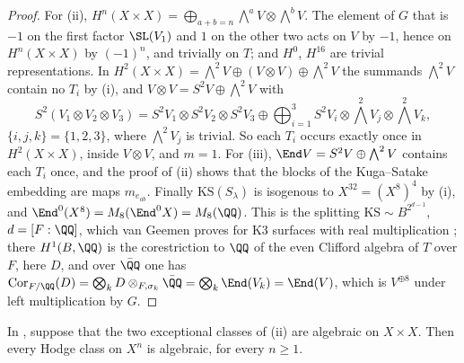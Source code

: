\begin{proof}
For (ii),
$H^{n}(X\times X)=\bigoplus_{a+b=n}\bigwedge^{a}V\otimes\bigwedge^{b}V$. The
element of $G$ that is $-1$ on the first factor $\SL(V_{1})$ and $1$ on the
other two acts on $V$ by $-1$, hence on $H^{n}(X\times X)$ by $(-1)^{n}$, and
trivially on $T$; and $H^{0}$, $H^{16}$ are trivial representations. In
$H^{2}(X\times X)=\bigwedge^{2}V\oplus(V\otimes V)\oplus\bigwedge^{2}V$ the
summands $\bigwedge^{2}V$ contain no $T_{i}$ by (i), and
$V\otimes V=S^{2}V\oplus\bigwedge^{2}V$ with
\[
  S^{2}(V_{1}\otimes V_{2}\otimes V_{3})
  =S^{2}V_{1}\otimes S^{2}V_{2}\otimes S^{2}V_{3}
  \oplus\bigoplus_{i=1}^{3}S^{2}V_{i}\otimes
  \textstyle\bigwedge^{2}V_{j}\otimes\bigwedge^{2}V_{k},
\]
$\{i,j,k\}=\{1,2,3\}$, where $\bigwedge^{2}V_{j}$ is trivial. So each $T_{i}$
occurs exactly once in $H^{2}(X\times X)$, inside $V\otimes V$, and $m=1$.
For (iii), $\End V=S^{2}V\oplus
\bigwedge^{2}V$ contains each $T_{i}$ once, and the proof of
(ii) shows that the blocks of the Kuga--Satake embedding
are maps $m_{e_{ab}}$. Finally $\mathrm{KS}(S_{\lambda})$ is isogenous to
$X^{32}=(X^{8})^{4}$ by (i), and
$\End^{0}(X^{8})=M_{8}(\End^{0}X)=M_{8}(\QQ)$. This is the splitting
$\mathrm{KS}\sim B^{2^{d-1}}$, $d=[F:\QQ]$, which van Geemen proves for K3
surfaces with real multiplication \cite{vG08}; there $H^{1}(B,\QQ)$ is the
corestriction to $\QQ$ of the even Clifford algebra of $T$ over $F$, here
$D$, and over $\bar{\QQ}$ one has $\operatorname{Cor}_{F/\QQ}(D)=
\bigotimes_{k}D\otimes_{F,\sigma_{k}}\bar{\QQ}=\bigotimes_{k}\End(V_{k})=
\End(V)$, which is $V^{\oplus8}$ under left multiplication by $G$.
\end{proof}

\begin{theorem}\label{thm:mumfordpowers}
In , suppose that the two exceptional classes of
(ii) are algebraic on $X\times X$. Then every Hodge
class on $X^{n}$ is algebraic, for every $n\ge1$.
\end{theorem}

